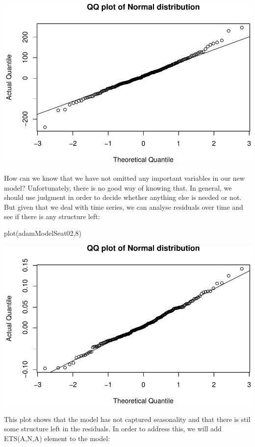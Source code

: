 \documentclass[
]{book}
\newenvironment{Shaded}{\begin{snugshade}}{\end{snugshade}}
\newcommand{\DecValTok}[1]{\textcolor[rgb]{0.00,0.00,0.81}{#1}}
\newcommand{\FunctionTok}[1]{\textcolor[rgb]{0.00,0.00,0.00}{#1}}
\newcommand{\NormalTok}[1]{#1}
\theoremstyle{definition}
\theoremstyle{definition}
\theoremstyle{definition}
\theoremstyle{definition}
\theoremstyle{remark}
\begin{document}
\includegraphics{adam_files/figure-latex/unnamed-chunk-131-1.pdf}

How can we know that we have not omitted any important variables in our new model? Unfortunately, there is no good way of knowing that. In general, we should use judgment in order to decide whether anything else is needed or not. But given that we deal with time series, we can analyse residuals over time and see if there is any structure left:

\begin{Shaded}
\begin{Highlighting}[]
\FunctionTok{plot}\NormalTok{(adamModelSeat02,}\DecValTok{8}\NormalTok{)}
\end{Highlighting}
\end{Shaded}

\includegraphics{adam_files/figure-latex/unnamed-chunk-132-1.pdf}

This plot shows that the model has not captured seasonality and that there is stil some structure left in the residuals. In order to address this, we will add ETS(A,N,A) element to the model:
\end{document}
